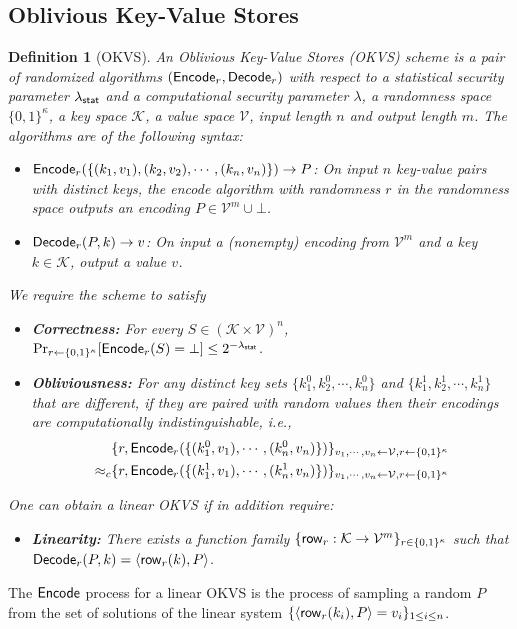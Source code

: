 \documentclass[sigconf]{acmart}
\newcommand{\Encode}{{\sf Encode}}
\newcommand{\Decode}{{\sf Decode}}
\newcommand{\row}{{\sf row}}
\newcommand{\ipd}[2]{\langle #1, #2 \rangle}
\newtheorem{definition}[theorem]{Definition}
\begin{document}
\subsection{Oblivious Key-Value Stores}
\begin{definition}[OKVS\cite{cryptoeprint:2021/883,cryptoeprint:2022/320}]
  An Oblivious Key-Value Stores (OKVS) scheme is a pair of randomized algorithms $(\Encode_r,\Decode_r)$ with respect to a statistical security parameter $\lambda_{\sf stat}$ and a computational security parameter $\lambda$, a randomness space $\{0,1\}^\kappa$, a key space $\mathcal{K}$, a value space $\mathcal{V}$, input length $n$ and output length $m$. The algorithms are of the following syntax: 
  \begin{itemize}
    \item $\Encode_r(\{(k_1,v_1),(k_2,v_2),\cdots,(k_n,v_n)\})\rightarrow P$: On input $n$ key-value pairs with distinct keys, the encode algorithm with randomness $r$ in the randomness space outputs an encoding $P\in\mathcal{V}^m\cup\bot$.
    \item $\Decode_r(P,k)\rightarrow v$: On input a (nonempty) encoding from $\mathcal{V}^m$ and a key $k\in\mathcal{K}$, output a value $v$. 
  \end{itemize}
  We require the scheme to satisfy
  \begin{itemize}
    \item \textbf{Correctness: }For every $S\in(\mathcal{K}\times\mathcal{V})^n$, $\Pr_{r\leftarrow\{0,1\}^\kappa}[\Encode_r(S)=\bot]\le 2^{-\lambda_{\sf stat}}$. 
    \item \textbf{Obliviousness: }For any distinct key sets $\{k_1^0,k_2^0,\cdots,k_n^0\}$ and $\{k_1^1,k_2^1,\cdots,k_n^1\}$ that are different, if they are paired with random values then their encodings are computationally indistinguishable, i.e., 
  \begin{align*}
    &\{r, \Encode_r(\{(k_1^0,v_1),\cdots,(k_n^0,v_n)\})\}_{v_1,\cdots,v_n\leftarrow \mathcal{V},r\leftarrow\{0,1\}^\kappa}\\
    \approx_c &\{r, \Encode_r(\{(k_1^1,v_1),\cdots,(k_n^1,v_n)\})\}_{v_1,\cdots,v_n\leftarrow \mathcal{V},r\leftarrow\{0,1\}^\kappa}
  \end{align*}
  \end{itemize}
One can obtain a \emph{linear OKVS} if in addition require:
\begin{itemize}
  \item \textbf{Linearity: }There exists a function family $\{\row_r:\mathcal{K}\rightarrow\mathcal{V}^m\}_{r\in\{0,1\}^\kappa}$ such that $\Decode_r(P,k) = \ipd{\row_r(k)}{P}$. 
\end{itemize}
\end{definition}
The $\Encode$ process for a linear OKVS is the process of sampling a random $P$ from the set of solutions of the linear system $\{\ipd{\row_r(k_i)}{P} = v_i\}_{1\le i\le n}$. 
\end{document}
